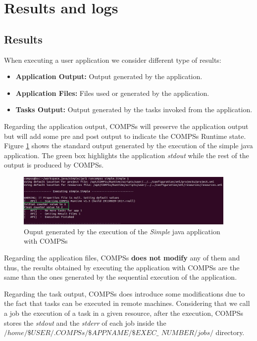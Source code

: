 \section{Results and logs}
\label{sec:Results_and_Logs}

\subsection{Results}
When executing a user application we consider different type of results:
\begin{itemize}
 \item \textbf{Application Output:} Output generated by the application.
 \item \textbf{Application Files:}  Files used or generated by the application.
 \item \textbf{Tasks Output:} Output generated by the tasks invoked from the application.
\end{itemize}

Regarding the application output, COMPSs will preserve the application output but will add some pre and post output to indicate
the COMPSs Runtime state. Figure \ref{fig:compss_out} shows the standard output generated by the execution of the 
simple java application. The green box highlights the application \textit{stdout} while the rest of the output is produced by COMPSs.  
\begin{figure}[h!]
  \centering
    \includegraphics[width=0.95\textwidth]{./Sections/3_Results_and_Logs/Figures/simple_java_stdout.jpeg}
    \caption{Ouput generated by the execution of the \textit{Simple} java application with COMPSs}
    \label{fig:compss_out}
\end{figure}

Regarding the application files, COMPSs \textbf{does not modify} any of them and thus, the
results obtained by executing the application with COMPSs are the same than the ones generated by the sequential execution
of the application.

Regarding the task output, COMPSs does introduce some modifications due to the fact that tasks can be executed in remote
machines. Considering that we call a job the execution of a task in a given resource, after the execution, COMPSs stores 
the \textit{stdout} and the \textit{stderr} of each job inside the \textbf{$/home/\$USER/.COMPSs/\$APPNAME/\$EXEC\_$
$NUMBER/jobs/$}
directory.

